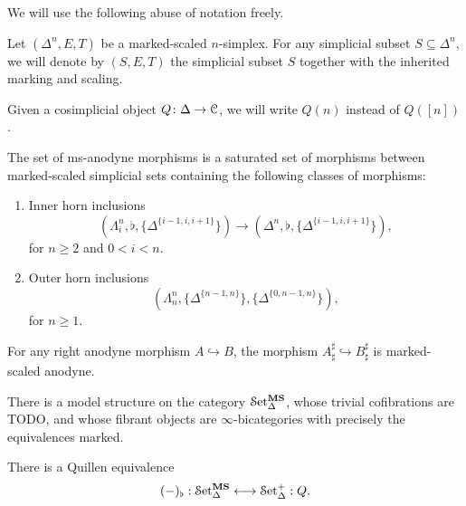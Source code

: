 \documentclass[main.tex]{subfiles}
\begin{document}
We will use the following abuse of notation freely.

\begin{notation}
  Let $(\Delta^{n}, E, T)$ be a marked-scaled $n$-simplex. For any simplicial subset $S \subseteq \Delta^{n}$, we will denote by $(S, E, T)$ the simplicial subset $S$ together with the inherited marking and scaling.
\end{notation}

\begin{notation}
  Given a cosimplicial object $Q\colon \Delta \to \mathcal{C}$, we will write $Q(n)$ instead of $Q([n])$.
\end{notation}

\begin{definition}
  \label{def:ms-anodyne_morphisms}
  The set of ms-anodyne morphisms is a saturated set of morphisms between marked-scaled simplicial sets containing the following classes of morphisms:
  \begin{enumerate}[label=(A\arabic*)]
    \item\label{item:innerms} Inner horn inclusions
      \begin{equation*}
        (\Lambda^{n}_{i}, \flat, \{\Delta^{\{i-1,i,i+1\}}\}) \to (\Delta^{n}, \flat, \{\Delta^{\{i-1,i,i+1\}}\}),
      \end{equation*}
      for $n \geq 2$ and $0 < i < n$.

    \item\label{item:outerms} Outer horn inclusions
      \begin{equation*}
        (\Lambda^{n}_{n}, \{\Delta^{\{n-1,n\}}\}, \{\Delta^{\{0, n-1, n\}}\}),
      \end{equation*}
      for $n \geq 1$.
  \end{enumerate}
\end{definition}

\begin{proposition}
  \label{prop:sharp_marked_right_anodyne}
  For any right anodyne morphism $A \hookrightarrow B$, the morphism $A^{\sharp}_{\sharp} \hookrightarrow B^{\sharp}_{\sharp}$ is marked-scaled anodyne.
\end{proposition}

\begin{theorem}
  There is a model structure on the category $\mathcal{S}\mathrm{et}_{\Delta}^{\mathbf{MS}}$, whose trivial cofibrations are TODO, and whose fibrant objects are $\infty$-bicategories with precisely the equivalences marked.
\end{theorem}

\begin{theorem}
  \label{thm:quillen_equiv_ms_and_scaled}
  There is a Quillen equivalence
  \begin{equation*}
    (-)_{\flat} : \mathcal{S}\mathrm{et}_{\Delta}^{\mathbf{MS}} \longleftrightarrow \mathcal{S}\mathrm{et}_{\Delta}^{+} : Q.
  \end{equation*}
\end{theorem}
\end{document}
